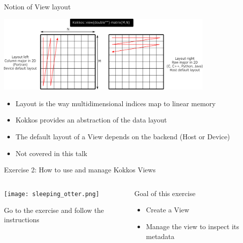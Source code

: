 \documentclass[aspectratio=169]{beamer}
\begin{document}

\begin{frame}{Notion of View layout}
    \begin{center}
        \includegraphics[width=0.8\textwidth]{layout_right_left.png}
    \end{center}
    \begin{itemize}
        \item Layout is the way multidimensional indices map to linear memory
        \item Kokkos provides an abstraction of the data layout
        \item The default layout of a View depends on the backend (Host or Device)
        \item Not covered in this talk
    \end{itemize}
\end{frame}


\begin{exerciseframe}{Exercise 2: How to use and manage Kokkos Views}
    \begin{columns}
        \begin{column}{0.5\linewidth}
            \begin{center}
                \texttt{[image: sleeping\_otter.png]}
            \end{center}

            Go to the exercise  and follow the instructions
        \end{column}
        \begin{column}{0.5\linewidth}
            \begin{block}{Goal of this exercise}
                \begin{itemize}
                    \item Create a View
                    \item Manage the view to inspect its metadata
                \end{itemize}
            \end{block}
        \end{column}
    \end{columns}
\end{exerciseframe}
\end{document}
